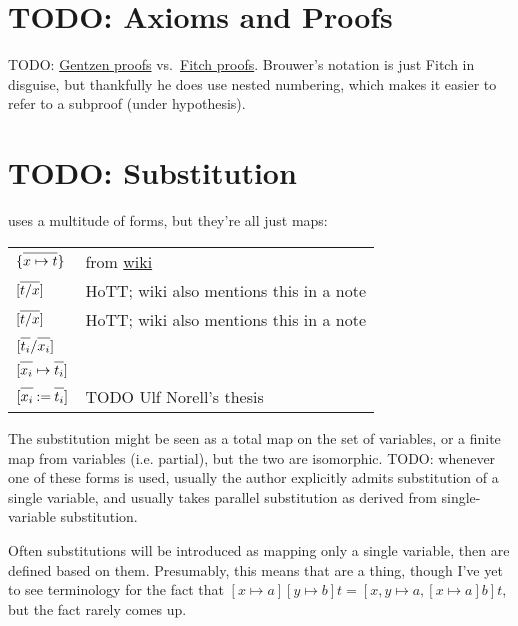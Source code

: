\documentclass[11pt]{article} %
\theoremstyle{definition}
\theoremstyle{remark}
\begin{document}
\section{TODO: Axioms and Proofs}

TODO: \href{https://en.wikipedia.org/wiki/Sequent_calculus}{Gentzen proofs} vs.\ \href{https://en.wikipedia.org/wiki/Fitch_notation}{Fitch proofs}. Brouwer's notation is just Fitch in disguise, but thankfully he does use nested numbering, which makes it easier to refer to a subproof (under hypothesis).


\section{TODO: Substitution}


 uses a multitude of forms, but they're all just maps:
\begin{center}
\renewcommand{\arraystretch}{1.2}
\begin{tabular}{lp{10cm}}
$\{\overline{\mathstrut x \mapsto t}\}$ &
    from \href{https://en.wikipedia.org/wiki/Substitution_(logic)}{wiki} \\
$[\overline{\mathstrut t/x}]$ & HoTT; wiki also mentions this in a note \\
$[\overline{\mathstrut t/x}]$ & HoTT; wiki also mentions this in a note \\
$[\overline{\mathstrut t_i} / \overline{\mathstrut x_i}]$ &  \\
$[\overline{\mathstrut x_i}\mapsto\overline{\mathstrut t_i}]$ &  \\
$[\overline{\mathstrut x_i}\mathbin{:=}\overline{\mathstrut t_i}]$ & TODO Ulf Norell's thesis \\
\end{tabular}
\end{center}
The substitution might be seen as a total map on the set of variables, or a finite map from variables (i.e. partial), but the two are isomorphic.
TODO: whenever one of these forms is used, usually the author explicitly admits substitution of a single variable, and usually takes parallel substitution as derived from single-variable substitution.

Often substitutions will be introduced as mapping only a single variable, then  are defined based on them.
Presumably, this means that  are a thing, though I've yet to see terminology for the fact that $[x \mapsto a][y \mapsto b]t = [x, y \mapsto a, [x \mapsto a]b]t$, but the fact rarely comes up.
\end{document}
